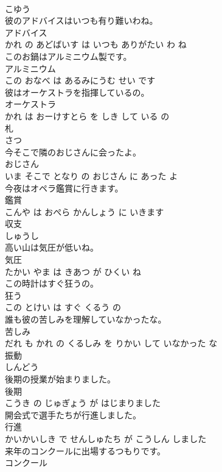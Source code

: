\documentclass[8pt]{extreport}
\begin{document}
\begin{CJK}{UTF8}{min}
\\	こゆう		
\\	彼のアドバイスはいつも有り難いわね。	
\\	アドバイス 
\\	かれ の あどばいす は いつも ありがたい わ ね			
\\	このお鍋はアルミニウム製です。	
\\	アルミニウム 
\\	この おなべ は あるみにうむ せい です			
\\	彼はオーケストラを指揮しているの。	
\\	オーケストラ 
\\	かれ は おーけすとら を しき して いる の			
\\	札	
\\	さつ		
\\	今そこで隣のおじさんに会ったよ。	
\\	おじさん 
\\	いま そこで となり の おじさん に あった よ			
\\	今夜はオペラ鑑賞に行きます。	
\\	鑑賞 
\\	こんや は おぺら かんしょう に いきます			
\\	収支	
\\	しゅうし		
\\	高い山は気圧が低いね。	
\\	気圧 
\\	たかい やま は きあつ が ひくい ね			
\\	この時計はすぐ狂うの。	
\\	狂う 
\\	この とけい は すぐ くるう の			
\\	誰も彼の苦しみを理解していなかったな。	
\\	苦しみ 
\\	だれ も かれ の くるしみ を りかい して いなかった な			
\\	振動	
\\	しんどう		
\\	後期の授業が始まりました。	
\\	後期 
\\	こうき の じゅぎょう が はじまりました			
\\	開会式で選手たちが行進しました。	
\\	行進 
\\	かいかいしき で せんしゅたち が こうしん しました			
\\	来年のコンクールに出場するつもりです。	
\\	コンクール 

\end{CJK}
\end{document}
